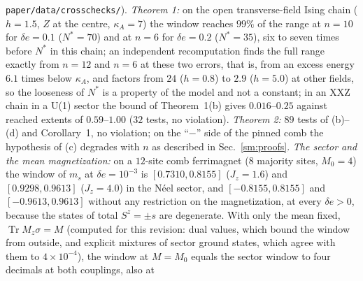 \documentclass[aps,prx,onecolumn,10pt,nofootinbib,longbibliography,floatfix]{revtex4-2}
\theoremstyle{remark}
\newcommand{\Jz}{J_z}
\newcommand{\ms}{m_s}
\newcommand{\de}{\delta e}
\newcommand{\Tr}{\operatorname{Tr}}
\begin{document}
\begin{itemize}
\texttt{paper/\allowbreak data/\allowbreak crosschecks/}). \emph{Theorem 1:} on the open transverse-field Ising chain ($h=1.5$, $Z$ at %
the centre, $\kappa_A=7$) the window reaches $99\%$ of the range at $n=10$ for $\de=0.1$ ($N^*=70$) and at $n=6$ %
for $\de=0.2$ ($N^*=35$), six to seven times before $N^*$ in this chain; an independent recomputation finds the %
full range exactly from $n=12$ and $n=6$ at these two errors, that is, from an excess energy $6.1$ times below %
$\kappa_A$, and factors from $24$ ($h=0.8$) to $2.9$ ($h=5.0$) at other fields, so the looseness of $N^*$ is a %
property of the model and not a constant; in an XXZ chain in a U(1) sector
the bound of Theorem~1(b) gives $0.016$--$0.25$ against reached extents of $0.59$--$1.00$ ($32$ tests, no %
violation). \emph{Theorem 2:} $89$ tests of (b)--(d) and Corollary~1, no violation; on the ``$-$'' side of the %
pinned comb the hypothesis of (c) degrades with $n$ as described in Sec.~\ref{sm:proofs}. \emph{The sector and the
mean magnetization:} on a
$12$-site comb ferrimagnet ($8$ majority sites, $M_0=4$) the window of $\ms$ at $\de=10^{-3}$ is $[0.7310,0.8155]$ %
($\Jz=1.6$) and $[0.9298,0.9613]$ ($\Jz=4.0$) in the N\'eel sector, and $[-0.8155,0.8155]$ and $[-0.9613,0.9613]$ %
without any restriction on the magnetization, at every $\de>0$, because the states of total $S^z=\pm s$ are
degenerate. With only the mean fixed, $\Tr M_z\sigma=M$ (computed for this revision: dual values, which
bound the window from outside, and explicit mixtures of sector ground states, which agree with them to
$4\times10^{-4}$), the window at $M=M_0$ equals the sector window to four decimals at both couplings, also at %

\end{itemize}
\end{document}
